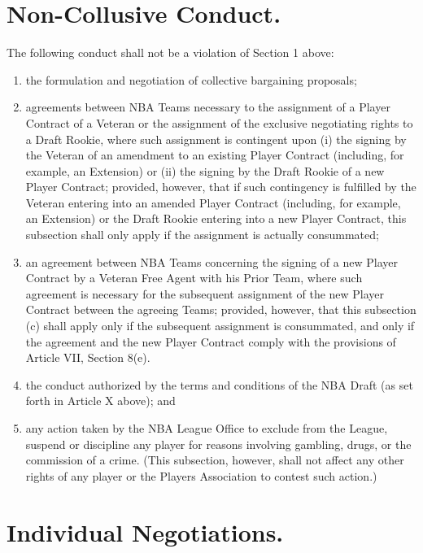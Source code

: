 \documentclass[
]{book}
\providecommand{\tightlist}{%
  \setlength{\itemsep}{0pt}\setlength{\parskip}{0pt}}
\begin{document}
\hypertarget{non-collusive-conduct.}{%
\section{\texorpdfstring{\textbf{Non-Collusive Conduct.}}{Non-Collusive Conduct.}}\label{non-collusive-conduct.}}

The following conduct shall not be a violation of Section 1 above:

\begin{enumerate}
\def\labelenumi{(\alph{enumi})}
\tightlist
\item
  the formulation and negotiation of collective bargaining proposals;
\item
  agreements between NBA Teams necessary to the assignment of a Player Contract of a Veteran or the assignment of the exclusive negotiating rights to a Draft Rookie, where such assignment is contingent upon (i) the signing by the Veteran of an amendment to an existing Player Contract (including, for example, an Extension) or (ii) the signing by the Draft Rookie of a new Player Contract; provided, however, that if such contingency is fulfilled by the Veteran entering into an amended Player Contract (including, for example, an Extension) or the Draft Rookie entering into a new Player Contract, this subsection shall only apply if the assignment is actually consummated;
\item
  an agreement between NBA Teams concerning the signing of a new Player Contract by a Veteran Free Agent with his Prior Team, where such agreement is necessary for the subsequent assignment of the new Player Contract between the agreeing Teams; provided, however, that this subsection (c) shall apply only if the subsequent assignment is consummated, and only if the agreement and the new Player Contract comply with the provisions of Article VII, Section 8(e).
\item
  the conduct authorized by the terms and conditions of the NBA Draft (as set forth in Article X above); and
\item
  any action taken by the NBA League Office to exclude from the League, suspend or discipline any player for reasons involving gambling, drugs, or the commission of a crime. (This subsection, however, shall not affect any other rights of any player or the Players Association to contest such action.)
\end{enumerate}

\hypertarget{individual-negotiations.}{%
\section{Individual Negotiations.}\label{individual-negotiations.}}
\end{document}
